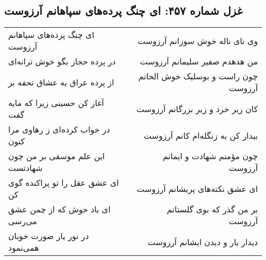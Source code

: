 \begin{center}
\section*{غزل شماره ۴۵۷: ای چنگ پرده‌های سپاهانم آرزوست}
\label{sec:0457}
\begin{longtable}{l p{0.5cm} r}
ای چنگ پرده‌های سپاهانم آرزوست
&&
وی نای ناله خوش سوزانم آرزوست
\\
در پرده حجاز بگو خوش ترانه‌ای
&&
من هدهدم صفیر سلیمانم آرزوست
\\
از پرده عراق به عشاق تحفه بر
&&
چون راست و بوسلیک خوش الحانم آرزوست
\\
آغاز کن حسینی زیرا که مایه گفت
&&
کان زیر خرد و زیر بزرگانم آرزوست
\\
در خواب کرده‌ای ز رهاوی مرا کنون
&&
بیدار کن به زنگله‌ام کانم آرزوست
\\
این علم موسقی بر من چون شهادتست
&&
چون مؤمنم شهادت و ایمانم آرزوست
\\
ای عشق عقل را تو پراکنده گوی کن
&&
ای عشق نکته‌های پریشانم آرزوست
\\
ای باد خوش که از چمن عشق می‌رسی
&&
بر من گذر که بوی گلستانم آرزوست
\\
در نور یار صورت خوبان همی‌نمود
&&
دیدار یار و دیدن ایشانم آرزوست
\\
\end{longtable}
\end{center}
